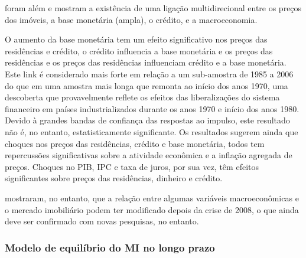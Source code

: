 \documentclass[
	12pt,				%
	oneside,			%
	a4paper,			%
	chapter=TITLE,		%
	section=TITLE,		%
	english,			%
	brazil				%
	]{abntex2}
\begin{document}
\textcite{goodhart2008} foram além e mostram a existência de uma ligação multidirecional
entre os preços dos imóveis, a base monetária (ampla), o crédito, e a
macroeconomia.
\begin{citacao}
O aumento da base monetária tem um efeito significativo nos preços das
residências e crédito, o crédito influencia a base monetária e os preços das 
residências e os preços das residências influenciam crédito e a base monetária. 
Este link é considerado mais forte em relação a um sub-amostra de 1985 
a 2006 do que em uma amostra mais longa que remonta ao início dos anos 1970, uma 
descoberta que provavelmente reflete os efeitos das liberalizações do sistema 
financeiro em países industrializados durante os anos 1970 e início dos anos 
1980. Devido à grandes bandas de confiança das respostas ao impulso, este 
resultado não é, no entanto, estatisticamente significante. Os resultados 
sugerem ainda que choques nos preços das residências, crédito e base monetária, 
todos tem repercussões significativas sobre a atividade econômica e a inflação 
agregada de preços. Choques no PIB, IPC e taxa de juros, por sua vez, têm 
efeitos significantes sobre preços das residências, dinheiro e crédito.
\cite[31]{goodhart2008}
\end{citacao}
\textcite{macroHousing} mostraram, no entanto, que a relação entre algumas variáveis
macroeconômicas e o mercado imobiliário podem ter modificado depois da crise
de 2008, o que ainda deve ser confirmado com novas pesquisas, no entanto.

\hypertarget{modelo-de-equiluxedbrio-do-no-longo-prazo}{%
\subsubsection{\texorpdfstring{Modelo de equilíbrio do \gls{MI} no longo prazo}{Modelo de equilíbrio do  no longo prazo}}\label{modelo-de-equiluxedbrio-do-no-longo-prazo}}
\end{document}
